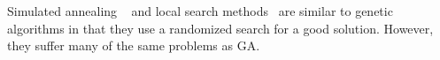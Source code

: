 Simulated annealing ~\cite{shroff1996genetic,664363} and local search
methods~\cite{622584,537394} are similar to genetic algorithms in that
they use a randomized search for a good solution. However, they suffer
many of the same problems as GA.




